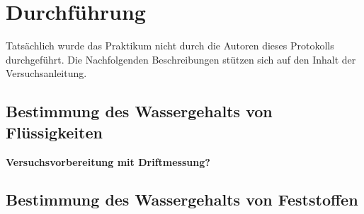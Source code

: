 \section{Durchführung}
\label{sec:durchfuerung}
Tatsächlich wurde das Praktikum nicht durch die Autoren dieses Protokolls durchgeführt. Die Nachfolgenden Beschreibungen stützen sich auf den Inhalt der Versuchsanleitung.
\subsection{Bestimmung des Wassergehalts von Flüssigkeiten}
\textbf{Versuchsvorbereitung mit Driftmessung?}

\subsection{Bestimmung des Wassergehalts von Feststoffen}

\newpage
